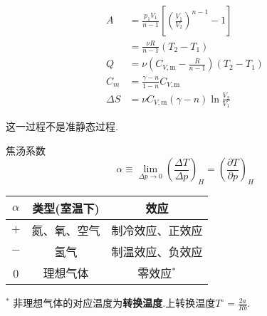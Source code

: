 \documentclass[10pt]{article}
\numberwithin{equation}{section}
\begin{document}
\begin{multicols}{3}
\begin{CJK}{UTF8}{gbsn}
\begin{align}
  A&=\frac{p_1V_{1}}{n -1}\left[\left(\frac{V_{1}}{V_{2}}\right)^{n -1}-1\right]\nonumber\\ &=\frac{\nu R}{n-1}(T_2-T_1) \\
  Q&=\nu \left( C_{V,\textrm{m}}-\frac{R}{n-1} \right) (T_2-T_1)\\
  C_m&=\frac{\gamma -n}{1-n}C_{V,\textrm{m}} \\
  \Delta S&=\nu C_{V,\textrm{m}} (\gamma -n)\ln \frac{V_{2}}{V_{1}}
\end{align}
\begin{center}
\end{center}
这一过程不是准静态过程.
\begin{center}
\end{center}

焦汤系数
\begin{equation}
  \alpha \equiv \lim_{\Delta p \rightarrow 0} \left( \frac{\Delta T}{\Delta p} \right)_H = \left(\frac{\partial T}{\partial p} \right)_H
\end{equation}




\begin{center}
\begin{tabular}{ccc}
  \hline
  $\alpha$ & 类型(室温下)  & 效应\\
  \hline
  $+$ & 氮、氧、空气 & 制冷效应、正效应\\
  $-$ & 氢气 & 制温效应、负效应 \\
  0 & 理想气体 & 零效应$^{*}$ \\
  \hline

\end{tabular}
\begin{flushleft}
\small $^{*}$ 非理想气体的对应温度为\textbf{转换温度}.上转换温度$T^{\circ}=\frac{2a}{Rb}$.
\end{flushleft}
\end{center}




\end{CJK}
\end{multicols}
\end{document}

